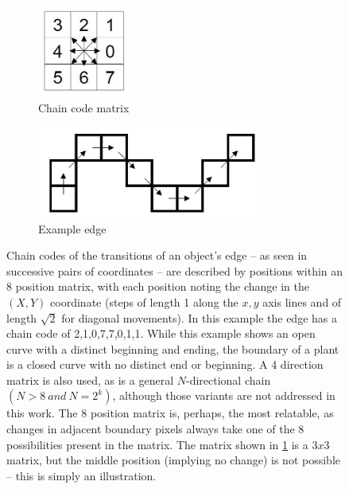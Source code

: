 \documentclass[letterpaper]{report}
\begin{document}
{ \begin{figure}[h!]
	\centering
	\begin{subfigure}[h]{.4\textwidth}
	  \centering
	  \includegraphics[height=3cm]{./figures/chain-code-matrix.jpg}
	  \caption{Chain code matrix}
	  \label{fig:chain-code-matrix}
	\end{subfigure}
	\begin{subfigure}[h]{.4\textwidth}
	  \centering
	  \includegraphics[height=3cm]{./figures/chain-code-cells.jpg}
	  \caption{Example edge}
	  \label{fig:chain-example}
	\end{subfigure}
	\caption[Boundary chain codes]{Chain codes of the transitions of an object's edge -- as seen in successive pairs of coordinates -- are described by positions within an 8 position matrix, with each position noting the change in the $(X, Y)$ coordinate (steps of length 1 along the $x,y$ axis lines and of length $\sqrt{2}$ for diagonal movements). In this example the edge has a chain code of 2,1,0,7,7,0,1,1. While this example shows an open curve with a distinct beginning and ending, the boundary of a plant is a closed curve with no distinct end or beginning. A 4 direction matrix is also used, as is a general $N$-directional chain $(N > 8\ and\ N =2^k)$, although those variants are not addressed in this work. The 8 position matrix is, perhaps, the most relatable, as changes in adjacent boundary pixels always take one of the 8 possibilities present in the matrix. The matrix shown in \ref{fig:chain-code-matrix} is a $3x3$ matrix, but the middle position (implying no change) is not possible -- this is simply an illustration.}
	\label{fig:chain-codes}
\end{figure}

}
\end{document}
